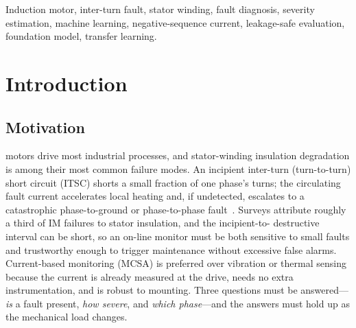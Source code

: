 \documentclass[journal]{IEEEtran}
\begin{document}
\begin{abstract}
fault-onset detection at $0\%$ pre-fault false alarm. A within-hardware evaluation on the real
motor confirms detection transfers (macro-F1 up to $0.99$) and severity is usable; per-window
faulted-phase localization is the main gap (macro-F1 $0.72$ vs.\ $0.97$ in simulation) but per-recording
aggregation recovers it to $0.93$--$0.95$---all reported transparently. Finally, leakage-safe Optuna
tuning with a cross-load objective and physics-consistent, signature-preserving training-fold
augmentation, evaluated under 10-fold grouped cross-validation, further raise cross-load severity
(within-one $0.91\!\rightarrow\!0.94$; in-distribution $0.93\!\rightarrow\!0.98$; mean absolute error
$-20\%$) and detection (LOLO $0.96\!\rightarrow\!0.98$). A novel block of biomedical anomaly features
(signal-complexity, entropy, fractal-dimension, and heart-rate-variability-style cycle-to-cycle measures
imported from ECG/EEG analysis) likewise lifts cross-load detection ($+0.03$) and severity ($+0.04$)
where absolute physics magnitudes do not transfer. All code, splits, and artifacts are released.
\end{abstract}

\begin{IEEEkeywords}
Induction motor, inter-turn fault, stator winding, fault diagnosis, severity estimation, machine
learning, negative-sequence current, leakage-safe evaluation, foundation model, transfer learning.
\end{IEEEkeywords}

\section{Introduction}
\subsection{Motivation}
 motors drive most industrial processes, and stator-winding
insulation degradation is among their most common failure modes. An incipient inter-turn
(turn-to-turn) short circuit (ITSC) shorts a small fraction of one phase's turns; the
circulating fault current accelerates local heating and, if undetected, escalates to a
catastrophic phase-to-ground or phase-to-phase fault~\cite{penman1994,cardoso2001}. Surveys
attribute roughly a third of IM failures to stator insulation, and the incipient-to-
destructive interval can be short, so an on-line monitor must be both sensitive to small
faults and trustworthy enough to trigger maintenance without excessive false alarms.
Current-based monitoring (MCSA) is preferred over vibration or thermal sensing because the
current is already measured at the drive, needs no extra instrumentation, and is robust to
mounting. Three questions must be answered---\emph{is} a fault present, \emph{how severe},
and \emph{which phase}---and the answers must hold up as the mechanical load changes.
\end{document}

